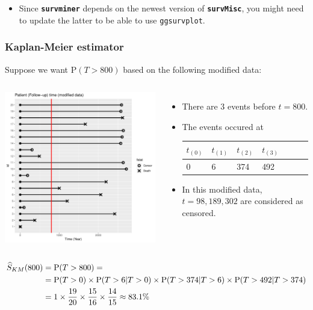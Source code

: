 \documentclass[10pt]{beamer}\usepackage[]{graphicx}\usepackage[]{color}
\newcommand{\pkg}[1]{{\textbf{\texttt{#1}}}}
\newcommand{\code}[1]{{\texttt{#1}}}
\newcommand{\p}{\mathrm{P}}
\newcommand{\Skm}{\widehat{S}_{\scriptsize{KM}}}
\begin{document}
\begin{frame}[fragile]
\begin{itemize}
  \item Since \pkg{survminer} depends on the newest version of \pkg{survMisc},
    you might need to update the latter to be able to use \code{ggsurvplot}.
  \end{itemize}
\end{frame}

\begin{frame}
  \frametitle{Kaplan-Meier estimator}
  Suppose we want $\p(T > 800)$ based on the following modified data:
  \begin{columns}
    \includegraphics[scale = .3]{tab1-1-5}
    \begin{itemize}
    \item There are 3 events before $t = 800$.
    \item The events occured at 
      {\scriptsize
      \begin{tabular}{lllllll}
        $t_{(0)}$ & $t_{(1)}$ & $t_{(2)}$ & $t_{(3)}$ \\
        \midrule
        0 & 6 & 374 & 492 \\
      \end{tabular}}
    \item In this modified data, $t = 98, 189, 302$ are considered as censored.
    \end{itemize}
  \end{columns}
  \vspace{-.3cm}
  {\scriptsize
  \begin{align*}
    \Skm(800) &= \p(T > 800) =\\
    &= \p(T > 0) \times \p(T > 6|T > 0) \times \p(T > 374|T > 6) \times \p(T > 492|T > 374) \\
    &=1 \times \frac{19}{20} \times \frac{15}{16} \times \frac{14}{15} \approx 83.1\%
  \end{align*}
  }
\end{frame}
\end{document}
